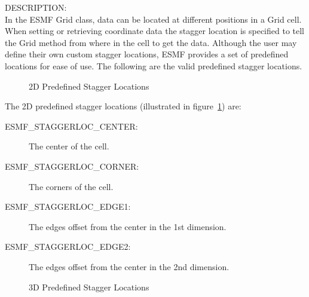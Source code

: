  {\sf DESCRIPTION:\\}
 In the ESMF Grid class, data can be located at different positions in a
 Grid cell.  When setting or retrieving coordinate data the stagger location is
 specified to tell the Grid method  from where in the cell to get the data. 
 Although the user may define their own custom stagger locations, 
 ESMF provides a set of predefined locations for ease of use. The
following are the valid predefined stagger locations. 

\medskip

\begin{center}
\begin{figure}
\center
{}
\caption{2D Predefined Stagger Locations}
\label{fig:gridstaggerloc2d}
\end{figure}
\end{center}

The 2D predefined stagger locations (illustrated in figure~\ref{fig:gridstaggerloc2d}) are:\\
\begin{description}
\item [ESMF\_STAGGERLOC\_CENTER:] The center of the cell.
\item [ESMF\_STAGGERLOC\_CORNER:] The corners of the cell.
\item [ESMF\_STAGGERLOC\_EDGE1:] The edges offset from the center in the 1st dimension.
\item [ESMF\_STAGGERLOC\_EDGE2:] The edges offset from the center in the 2nd dimension.
\end{description}

\medskip

\begin{center}
\begin{figure}
\center
{}
\caption{3D Predefined Stagger Locations}
\label{fig:gridstaggerloc3d}
\end{figure}
\end{center}


